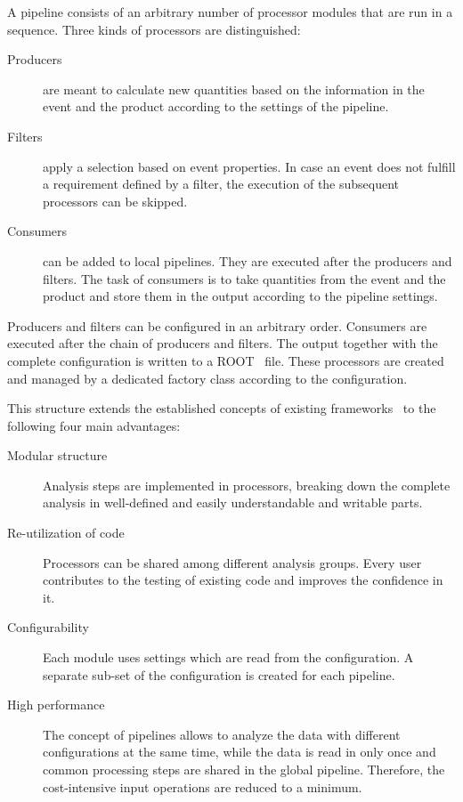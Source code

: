 \documentclass[3p]{elsarticle}
\begin{document}
A pipeline consists of an arbitrary number of processor modules that are run in a sequence.
Three kinds of processors are distinguished:
\begin{description}
\item[Producers] are meant to calculate new quantities based on the information in the event and the product according to the settings of the pipeline.
\item[Filters] apply a selection based on event properties.
In case an event does not fulfill a requirement defined by a filter, the execution of the subsequent processors can be skipped.
\item[Consumers] can be added to local pipelines.
They are executed after the producers and filters.
The task of consumers is to take quantities from the event and the product and store them in the output according to the pipeline settings.
\end{description}
Producers and filters can be configured in an arbitrary order.
Consumers are executed after the chain of producers and filters.
The output together with the complete configuration is written to a ROOT~\cite{root} file.
These processors are created and managed by a dedicated factory class according to the configuration.

This structure extends the established concepts of existing frameworks~\cite{cmssw} to the following four main advantages:
\begin{description}
\item[Modular structure] Analysis steps are implemented in processors, breaking down the complete analysis in well-defined and easily understandable and writable parts.
\item[Re-utilization of code] Processors can be shared among different analysis groups.
Every user contributes to the testing of existing code and improves the confidence in it.
\item[Configurability] Each module uses settings which are read from the configuration.
A separate sub-set of the configuration is created for each pipeline.
\item[High performance] The concept of pipelines allows to analyze the data with different configurations at the same time, while the data is read in only once and common processing steps are shared in the global pipeline.
Therefore, the cost-intensive input operations are reduced to a minimum.
\end{description}
\end{document}
